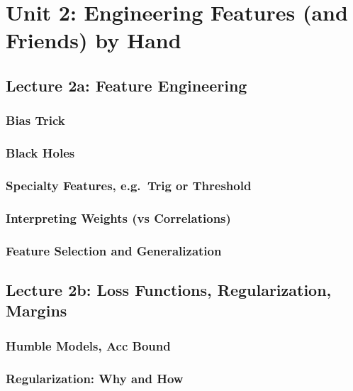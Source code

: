 \documentclass[12pt]{article}
\begin{document}
      \subsubsection*{}
      \subsubsection*{}
    \newpage

  \section*{\sc Unit 2: Engineering Features (and Friends) by Hand}
    \subsection*{Lecture 2a: Feature Engineering}
      \subsubsection*{Bias Trick}
      \subsubsection*{Black Holes}
      \subsubsection*{Specialty Features, e.g.\ Trig or Threshold}
      \subsubsection*{Interpreting Weights (vs Correlations)}
      \subsubsection*{Feature Selection and Generalization}
    \newpage

    \subsection*{Lecture 2b: Loss Functions, Regularization, Margins} %
      \subsubsection*{Humble Models, Acc Bound}
      \subsubsection*{Regularization: Why and How}
\end{document}
